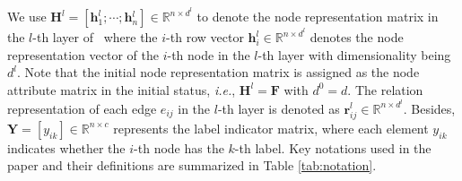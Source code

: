 We use $\mathbf{H}^{l} = [\mathbf{h}^{l}_{1}; \cdots; \mathbf{h}{^{l}_{n}}] \in \mathbb{R}^{n \times {d^{l}} }$ to denote the node representation matrix in the $l$-th layer of \alg~where the $i$-th row vector $\mathbf{h}^{l}_{i} \in \mathbb{R}^{n \times {d^{l}} }$ denotes the node representation vector of the $i$-th node in the $l$-th layer with dimensionality being $d^{l}$. 
Note that the initial node representation matrix is assigned as the node attribute matrix in the initial status, \emph{i.e.}, $\mathbf{H}^{l} = \mathbf{F}$ with $d^{0} = d$. 
%
The relation representation of each edge $e_{ij}$ in the $l$-th layer is denoted as $\mathbf{r}{^{l}_{ij}} \in \mathbb{R}^{n \times {d^{l}}}$. 
%
Besides, $\mathbf{Y} = [ y_{ik} ] \in \mathbb{R}^{n \times {c}}$ represents the label indicator matrix, where each element $y_{ik}$ indicates whether the $i$-th node has the $k$-th label.
%
Key notations used in the paper and their definitions are summarized in Table \ref{tab:notation}.
